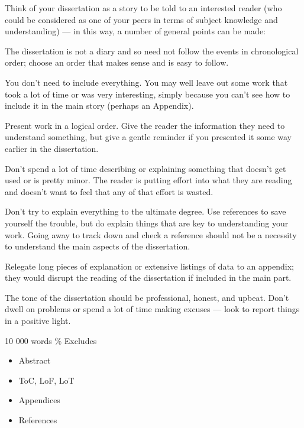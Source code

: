 Think of your dissertation as a story to be told to an interested reader (who could be considered as one of your peers in terms of subject knowledge and understanding) — in this way, a number of general points can be made:

The dissertation is not a diary and so need not follow the events in chronological order; choose an order that makes sense and is easy to follow.

You don't need to include everything. You may well leave out some work that took a lot of time or was very interesting, simply because you can't see how to include it in the main story (perhaps an Appendix).

Present work in a logical order. Give the reader the information they need to understand something, but give a gentle reminder if you presented it some way earlier in the dissertation.

Don't spend a lot of time describing or explaining something that doesn't get used or is pretty minor. The reader is putting effort into what they are reading and doesn't want to feel that any of that effort is wasted.

Don't try to explain everything to the ultimate degree. Use references to save yourself the trouble, but do explain things that are key to understanding your work. Going away to track down and check a reference should not be a necessity to understand the main aspects of the dissertation.

Relegate long pieces of explanation or extensive listings of data to an appendix; they would disrupt the reading of the dissertation if included in the main part.

The tone of the dissertation should be professional, honest, and upbeat. Don't dwell on problems or spend a lot of time making excuses — look to report things in a positive light.

10 000 words \%
Excludes
\begin{itemize}
\item Abstract
\item ToC, LoF, LoT
\item Appendices
\item References
\end{itemize}